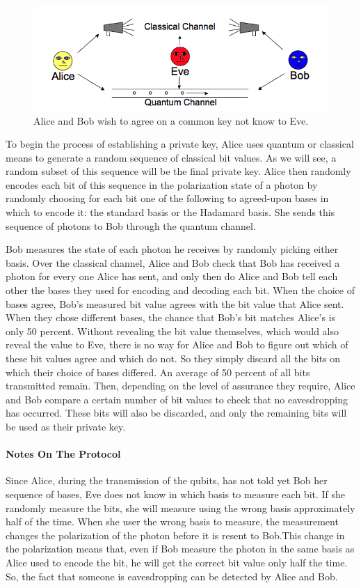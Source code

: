 \documentclass[12pt,a4paper]{report}
\begin{document}
\begin{figure}[h]
	\centering
	\includegraphics[width=0.7\linewidth]{img/BB84}
	\caption{Alice and Bob wish to agree on a common key not know to Eve.}
	\label{BB84}
\end{figure}

To begin the process of establishing a private key, Alice uses quantum or classical means to generate a random sequence of classical bit values. As we will see, a random subset of this sequence will be the final private key. Alice then randomly encodes each bit of this sequence in the polarization state of a photon by randomly choosing for each bit one of the following to agreed-upon bases in which to encode it: the standard basis or the Hadamard basis. She sends this sequence of photons to Bob through the quantum channel.

Bob measures the state of each photon he receives by randomly picking either basis. Over the classical channel, Alice and Bob check that Bob has received a photon for every one Alice has sent, and only then do Alice and Bob tell each other the bases they used for encoding and decoding each bit. When the choice of bases agree, Bob's measured bit value agrees with the bit value that Alice sent. When they chose different bases, the chance that Bob's bit matches Alice's is only 50 percent. Without revealing the bit value themselves, which would also reveal the value to Eve, there is no way for Alice and Bob to figure out which of these bit values agree and which do not. So they simply discard all the bits on which their choice of bases differed. An average of 50 percent of all bits transmitted remain. Then, depending on the level of assurance they require, Alice and Bob compare a certain number of bit values to check that no eavesdropping has occurred. These bits will also be discarded, and only the remaining bits will be used as their private key.

\paragraph{Notes On The Protocol}
Since Alice, during the transmission of the qubits, has not told yet Bob her sequence of bases, Eve does not know in which basis to measure each bit. If she randomly measure the bits, she will measure using the wrong basis approximately half of the time. When she user the wrong basis to measure, the measurement changes the polarization of the photon before it is resent to Bob.This change in the polarization means that, even if Bob measure the photon in the same basis as Alice used to encode the bit, he will get the correct bit value only half the time. So, the fact that someone is eavesdropping can be detected by Alice and Bob.
\end{document}
